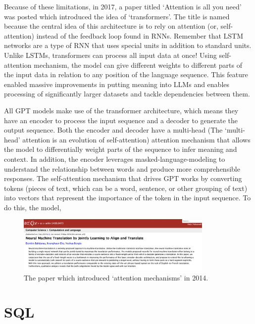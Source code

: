 \documentclass[11pt]{article}
\begin{document}
Because of these limitations, in 2017, a paper titled `Attention is all you need' was posted which introduced the idea of `transformers'. 
The title is named because the central idea of this architecture is to rely on attention (or, self-attention) 
instead of the feedback loop found in RNNs. Remember that 
LSTM networks are a type of RNN that uses special units in addition to standard units. 
Unlike LSTMs, transformers can process all input data at once! 
Using self-attention mechanism, the model can give different 
weights to different parts of the input data in relation to any position of the language sequence. 
This feature enabled massive improvements in putting meaning into LLMs 
and enables processing of significantly larger datasets and tackle dependencies between them. 


All GPT models make use of 
the transformer architecture, which means they have an encoder to process the input sequence and a decoder to generate the output sequence. 
Both the encoder and decoder have a multi-head (The ‘multi-head’ attention is an evolution of self-attention) attention mechanism that allows the model to differentially weight parts of the sequence to infer meaning and context. 
In addition, the encoder leverages masked-language-modeling to understand the relationship between words and produce more comprehensible responses.
The self-attention mechanism that drives GPT works by converting tokens (pieces of text, which can be a word, sentence, or other grouping of text) into vectors that represent the importance of the token in the input sequence. 
To do this, the model,







\begin{figure}
\centering 
\includegraphics[width=0.85\textwidth]{paper1.png}
\caption{\label{fig:PAPER1}The paper which introduced `attention mechanisms' in 2014.}
\end{figure}


\section{SQL}
\end{document}
